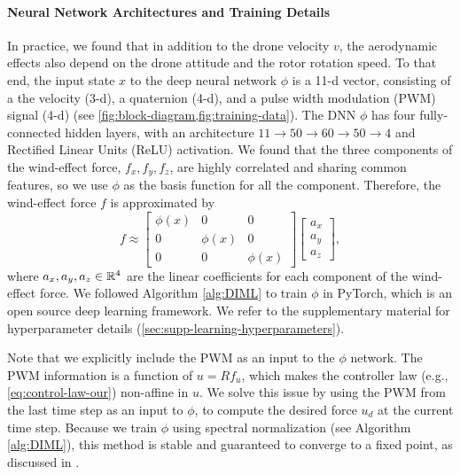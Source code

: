 \paragraph{Neural Network Architectures and Training Details}
In practice, we found that in addition to the drone velocity $v$, the aerodynamic effects also depend on the drone attitude and the rotor rotation speed. To that end, the input state $x$ to the deep neural network $\phi$ is a 11-d vector, consisting of a the  velocity (3-d),  a quaternion (4-d), and  a pulse width modulation (PWM) signal (4-d) (see \cref{fig:block-diagram,fig:training-data}). The DNN $\phi$ has four fully-connected hidden layers, with an architecture $11\rightarrow50\rightarrow60\rightarrow50\rightarrow4$ and Rectified Linear Units (ReLU) activation. We found that the three components of the wind-effect force, $f_x,f_y,f_z$, are highly correlated and sharing common features, so we use $\phi$ as the basis function for all the component. Therefore, the wind-effect force $f$ is approximated by
\begin{equation}
    f \approx \begin{bmatrix}
    \phi(x) & 0 & 0 \\
    0 & \phi(x) & 0 \\
    0 & 0 & \phi(x)
    \end{bmatrix}
    \begin{bmatrix}
    a_x \\ a_y \\ a_z 
    \end{bmatrix},
\end{equation}
where $a_x,a_y,a_z\in\mathbb{R}^4$ are the linear coefficients for each component of the wind-effect force. We followed Algorithm \ref{alg:DIML} to train $\phi$ in PyTorch, which is an open source deep learning framework. We refer to the supplementary material for hyperparameter details (\ref{sec:supp-learning-hyperparameters}).

Note that we explicitly include the PWM as an input to the $\phi$ network. The PWM information is a function of $u=Rf_u$, which makes the controller law (e.g., \cref{eq:control-law-our}) non-affine in $u$. We solve this issue by using the PWM from the last time step as an input to $\phi$, to compute the desired force $u_d$ at the current time step. Because we train $\phi$ using spectral normalization (see Algorithm \ref{alg:DIML}), this method is stable and guaranteed to converge to a fixed point, as discussed in \cite{shi2019neural}.

